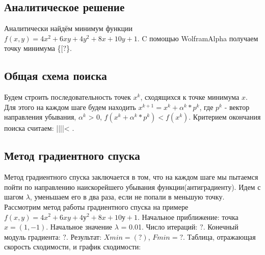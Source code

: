 \subsection{Аналитическое решение}\label{subsec:аналитическое-решение}
Аналитически найдём минимум функции {$f(x,y) = 4x^2 + 6xy + 4y^2 + 8x + 10y + 1$}.
\newline
C помощью WolframAlpha получаем точку минимума \{$[?$\}.

\subsection{Общая схема поиска}\label{subsec:общая-схема-поиска}
Будем строить последовательность точек {$x^k$}, сходящихся к точке минимума $x$. \newline
Для этого на каждом шаге будем находить \newline
{$x^{k+1}=x^k+\alpha^{k}*p^k$}, где {$p^k$} - вектор направления убывания, {$\alpha^k$} > 0, \newline
{$f(x^k+\alpha^k*p^k) < f(x^k)$}.\newline
Критерием окончания поиска считаем: ||||< {\varepsilon}.
\newline

\subsection{Метод градиентного спуска}\label{subsec:метод-градиентного-спуска2}
Метод градиентного спуска заключается в том, что на каждом шаге мы пытаемся пойти по направлению наискорейшего убывания функции(антиградиенту).
Идем с шагом $\lambda$, уменьшаем его в два раза, если не попали в меньшую точку. \newline
Рассмотрим метод работы градиентного спуска на примере {$f(x,y) = 4x^2 + 6xy + 4у^2 + 8x + 10у + 1$}.
Начальное приближение: точка {$x = (1, -1)$}. \newline
Начальное значение $\lambda$ = 0.01. \newline
Число итераций: $?$. \newline
Конечный модуль градиента: $?$.\newline
Результат: $Xmin = (?)$, $Fmin = ?$.
\newline
\newline
Таблица, отражающая скорость сходимости, и график сходимости:

